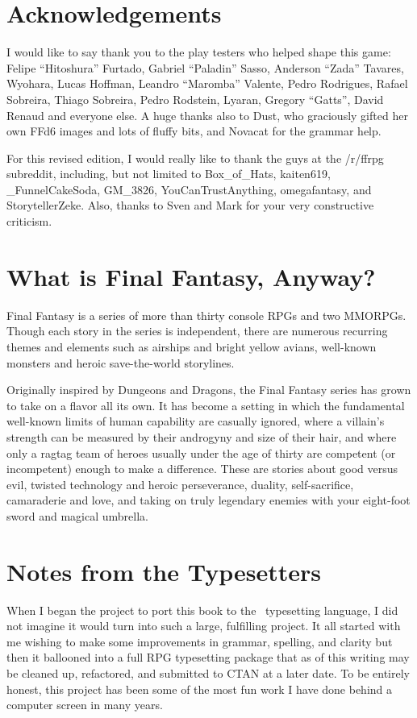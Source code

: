 \begin{multicols}{2}
\section{Acknowledgements}\label{sec:acknowledgements}
I would like to say thank you to the play testers who helped shape this game: Felipe “Hitoshura” Furtado, Gabriel “Paladin” Sasso, Anderson “Zada” Tavares, Wyohara, Lucas Hoffman, Leandro “Maromba” Valente, Pedro Rodrigues, Rafael Sobreira, Thiago Sobreira, Pedro Rodstein, Lyaran, Gregory “Gatts”, David Renaud and everyone else. A huge thanks also to Dust, who graciously gifted her own FFd6 images and lots of fluffy bits, and Novacat for the grammar
help. \pw%

For this revised edition, I would really like to thank the guys at the /r/ffrpg subreddit, including, but not limited to Box\_of\_Hats, kaiten619, \_FunnelCakeSoda, GM\_3826, YouCanTrustAnything, omegafantasy, and StorytellerZeke. Also, thanks to Sven and Mark for your very constructive criticism.

\section{What is Final Fantasy, Anyway?}\label{sec:whatff}
Final Fantasy is a series of more than thirty console RPGs and two MMORPGs. Though each story in the series is independent, there are numerous recurring themes and elements such as airships and bright yellow avians, well-known monsters and heroic save-the-world storylines.

Originally inspired by Dungeons and Dragons, the Final Fantasy series has grown to take on a flavor all its own. It has become a setting in which the fundamental well-known limits of human capability are casually ignored, where a villain’s strength can be measured by their androgyny and size of their hair, and where only a ragtag team of heroes usually under the age of thirty are competent (or incompetent) enough to make a difference. These are stories about good versus evil, twisted technology and heroic perseverance, duality, self-sacrifice, camaraderie and love, and taking on truly legendary enemies with your eight-foot sword and magical umbrella.

\section{Notes from the Typesetters}\label{sec:forward-typesetting}
When I began the project to port this book to the \XeLaTeX\ typesetting language, I did not imagine it would turn into such a large, fulfilling project. It all started with me wishing to make some improvements in grammar, spelling, and clarity but then it ballooned into a full RPG typesetting package that as of this writing may be cleaned up, refactored, and submitted to CTAN at a later date. To be entirely honest, this project has been some of the most fun work I have done behind a computer screen in many years.\pc%


\end{multicols}
